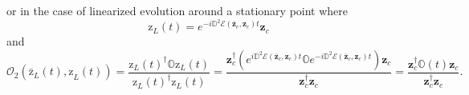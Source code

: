 \documentclass[aps,preprint]{revtex4}%
\begin{document}
or in the case of linearized evolution around a stationary point where
\begin{equation}
\mathrm{z}_{L}\left(  t\right)  =e^{-i\mathbb{D}^{2}\mathcal{E}\left(
\mathbf{\bar{z}}_{c},\mathbf{z}_{c}\right)  t}\mathbf{z}_{c}%
\end{equation}
and
\begin{equation}
\mathcal{O}_{2}\left(  \mathrm{\bar{z}}_{L}\left(  t\right)  \mathrm{,z}%
_{L}\left(  t\right)  \right)  =\frac{\mathrm{z}_{L}\left(  t\right)
^{\dagger}\mathbb{O}\mathrm{z}_{L}\left(  t\right)  }{\mathrm{z}_{L}\left(
t\right)  ^{\dagger}\mathrm{z}_{L}\left(  t\right)  }=\frac{\mathbf{z}%
_{c}^{\dagger}\left(  e^{i\mathbb{D}^{2}\mathcal{E}\left(  \mathbf{\bar{z}%
}_{c},\mathbf{z}_{c}\right)  t}\mathbb{O}e^{-i\mathbb{D}^{2}\mathcal{E}\left(
\mathbf{\bar{z}}_{c},\mathbf{z}_{c}\right)  t}\right)  \mathbf{z}_{c}%
}{\mathbf{z}_{c}^{\dagger}\mathbf{z}_{c}}=\frac{\mathbf{z}_{c}^{\dagger
}\mathbb{O}\left(  t\right)  \mathbf{z}_{c}}{\mathbf{z}_{c}^{\dagger
}\mathbf{z}_{c}}.
\end{equation}


\bigskip%
\end{document}
